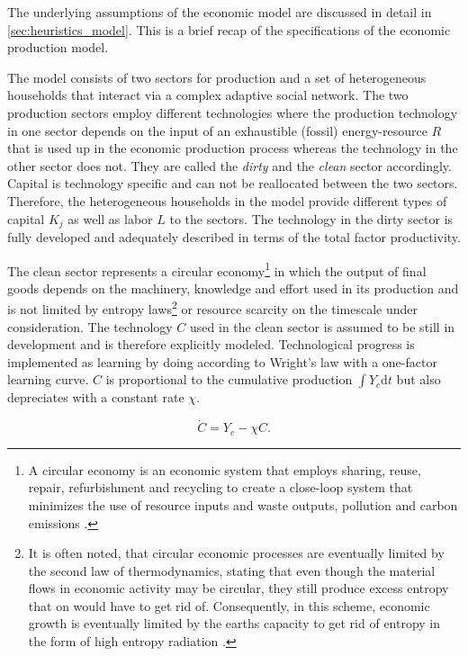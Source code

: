 The underlying assumptions of the economic model are discussed in detail in \cref{sec:heuristics_model}. This is a brief recap of the specifications of the economic production model. 

The model consists of two sectors for production and a set of heterogeneous households that interact via a complex adaptive social network. The two production sectors employ different technologies where the production technology in one sector depends on the input of an exhaustible (fossil) energy-resource $R$ that is used up in the economic production process whereas the technology in the other sector does not. They are called the \textit{dirty} and the \textit{clean} sector accordingly. Capital is technology specific and can not be reallocated between the two sectors.
Therefore, the heterogeneous households in the model provide different types of capital $K_j$ as well as labor $L$ to the sectors.
The technology in the dirty sector is fully developed and adequately described in terms of the total factor productivity. 

The clean sector represents a circular economy\footnote{A circular economy is an economic system that employs sharing, reuse, repair, refurbishment and recycling to create a close-loop system that minimizes the use of resource inputs and waste outputs, pollution and carbon emissions \citep{Stahel2016, Geissdoerfer2017}.} in which the output of final goods depends on the machinery, knowledge and effort used in its production and is not limited by entropy laws\footnote{It is often noted, that circular economic processes are eventually limited by the second law of thermodynamics, stating that even though the material flows in economic activity may be circular, they still produce excess entropy that on would have to get rid of. Consequently, in this scheme, economic growth is eventually limited by the earths capacity to get rid of entropy in the form of high entropy radiation \citep{Georgescu-Roegen1993, Kaberger2001, Korhonen2018}.} or resource scarcity on the timescale under consideration. The technology $C$ used in the clean sector is assumed to be still in development and is therefore explicitly modeled.
Technological progress is implemented as learning by doing according to Wright's law \citep{wright1936factors, Nagy2013} with a one-factor learning curve. $C$ is proportional to the cumulative production $\int Y_c \mathrm{d}t$ but also depreciates with a constant rate $\chi$.

\begin{equation}
	\dot{C} = Y_c - \chi C.
	\label{eq:approx_lbd}
\end{equation}

